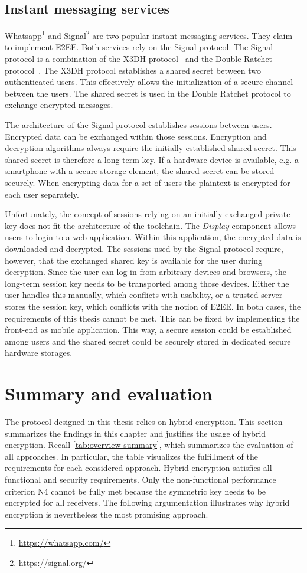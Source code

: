 \documentclass[../main.tex]{subfiles}
\begin{document}
\subsection{Instant messaging services}
Whatsapp\footnote{\url{https://whatsapp.com/}} and Signal\footnote{\url{https://signal.org/}} are two popular instant messaging services.
They claim to implement E2EE.
Both services rely on the Signal protocol.
The Signal protocol is a combination of the X3DH protocol~\cite{Marlinspike2016} and the Double Ratchet protocol~\cite{Perrin2016}.
The X3DH protocol establishes a shared secret between two authenticated users.
This effectively allows the initialization of a secure channel between the users.
The shared secret is used in the Double Ratchet protocol to exchange encrypted messages.~\cite{Marlinspike2016, Perrin2016}

The architecture of the Signal protocol establishes sessions between users.
Encrypted data can be exchanged within those sessions.
Encryption and decryption algorithms always require the initially established shared secret.
This shared secret is therefore a long-term key.
If a hardware device is available, e.g. a smartphone with a secure storage element, the shared secret can be stored securely. 
When encrypting data for a set of users the plaintext is encrypted for each user separately.~\cite{Marlinspike2014}

Unfortunately, the concept of sessions relying on an initially exchanged private key does not fit the architecture of the toolchain.
The \emph{Display} component allows users to login to a web application.
Within this application, the encrypted data is downloaded and decrypted.
The sessions used by the Signal protocol require, however, that the exchanged shared key is available for the user during decryption.
Since the user can log in from arbitrary devices and browsers, the long-term session key needs to be transported among those devices.
Either the user handles this manually, which conflicts with usability, or a trusted server stores the session key, which conflicts with the notion of E2EE.
In both cases, the requirements of this thesis cannot be met.
This can be fixed by implementing the front-end as mobile application.
This way, a secure session could be established among users and the shared secret could be securely stored in dedicated secure hardware storages.

\section{Summary and evaluation}
\label{sec:justification}
The protocol designed in this thesis relies on hybrid encryption.
This section summarizes the findings in this chapter and justifies the usage of hybrid encryption.
Recall \cref{tab:overview-summary}, which summarizes the evaluation of all approaches.
In particular, the table visualizes the fulfillment of the requirements for each considered approach.
Hybrid encryption satisfies all functional and security requirements.
Only the non-functional performance criterion N4 cannot be fully met because the symmetric key needs to be encrypted for all receivers.
The following argumentation illustrates why hybrid encryption is nevertheless the most promising approach.
\end{document}

